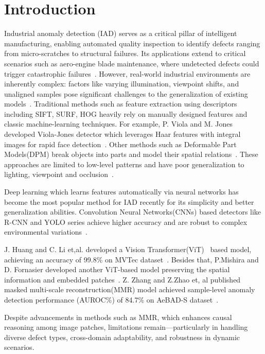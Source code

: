 \section{Introduction}
Industrial anomaly detection (IAD) serves as a critical pillar of intelligent manufacturing, enabling automated quality inspection to identify defects ranging from micro-scratches to structural failures. 
Its applications extend to critical scenarios such as aero-engine blade maintenance, where undetected defects could trigger catastrophic failures~\cite{intro1}. 
However, real-world industrial environments are inherently complex: factors like varying illumination, viewpoint shifts, and unaligned samples pose significant challenges to the generalization of existing models~\cite{intro2}. 
Traditional methods such as feature extraction using descriptors including SIFT, SURF, HOG heavily rely on manually designed features 
and classic machine-learning techniques. For example, P. Viola and M. Jones developed Viola-Jones detector which leverages Haar features with integral images for rapid face detection~\cite{Viola-Jones}.
Other methods such as Deformable Part Models(DPM) break objects into parts and model their spatial relations~\cite{DFM}.
These approaches are limited to low-level patterns and have poor generalization to lighting, viewpoint and occlusion~\cite{why-traditional-bad}.

Deep learning which learns features automatically via neural networks has become the most popular method for IAD recently 
for its simplicity and better generalization abilities. Convolution Neural Networks(CNNs) based detectors like R-CNN and YOLO series
achieve higher accuracy and are robust to complex environmental variations~\cite{why-traditional-bad,survey-ml1}.

J. Huang and C. Li et,al. developed a Vision Transformer(ViT)~\cite{VIT} based model, achieving an accuracy of 99.8\% on MVTec dataset~\cite{VIT-model1}.
Besides that, P.Mishira and D. Fornasier developed another ViT-based model preserving the spatial information and embedded patches~\cite{VIT-model2}.
Z. Zhang and Z.Zhao et, al published masked multi-scale reconstruction(MMR) model 
achieved sample-level anomaly detection performance (AUROC\%) of 84.7\% on AeBAD-S dataset~\cite{MMR}. 

Despite advancements in methods such as MMR, which enhances causal reasoning among image patches, limitations remain—particularly in handling diverse defect types, cross-domain adaptability, and robustness in dynamic scenarios.

